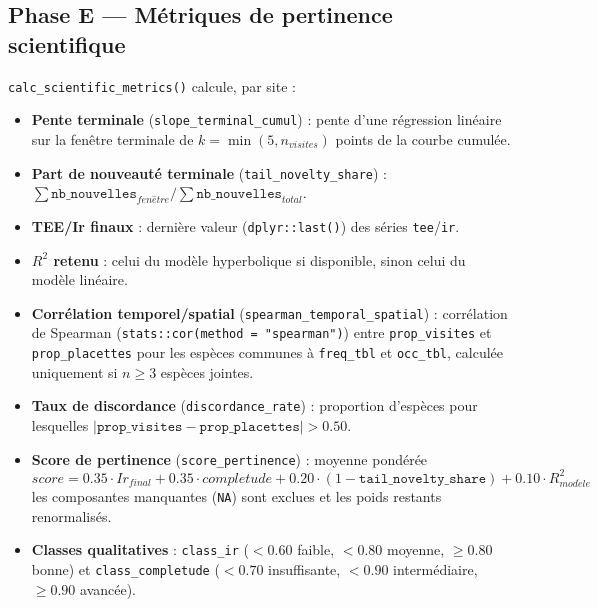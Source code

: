 \documentclass[11pt,a4paper]{article}
\begin{document}
\subsection{Phase E --- Métriques de pertinence scientifique}
\texttt{calc\_scientific\_metrics()} calcule, par site :
\begin{itemize}[leftmargin=1.2cm]
  \item \textbf{Pente terminale} (\texttt{slope\_terminal\_cumul}) : pente d'une régression linéaire sur la fenêtre terminale de $k = \min(5, n_{visites})$ points de la courbe cumulée.
  \item \textbf{Part de nouveauté terminale} (\texttt{tail\_novelty\_share}) : $\sum \texttt{nb\_nouvelles}_{fen\hat{e}tre} / \sum \texttt{nb\_nouvelles}_{total}$.
  \item \textbf{TEE/Ir finaux} : dernière valeur (\texttt{dplyr::last()}) des séries \texttt{tee}/\texttt{ir}.
  \item \textbf{$R^2$ retenu} : celui du modèle hyperbolique si disponible, sinon celui du modèle linéaire.
  \item \textbf{Corrélation temporel/spatial} (\texttt{spearman\_temporal\_spatial}) : corrélation de Spearman (\texttt{stats::cor(method = "spearman")}) entre \texttt{prop\_visites} et \texttt{prop\_placettes} pour les espèces communes à \texttt{freq\_tbl} et \texttt{occ\_tbl}, calculée uniquement si $n \ge 3$ espèces jointes.
  \item \textbf{Taux de discordance} (\texttt{discordance\_rate}) : proportion d'espèces pour lesquelles $|\texttt{prop\_visites} - \texttt{prop\_placettes}| > 0.50$.
  \item \textbf{Score de pertinence} (\texttt{score\_pertinence}) : moyenne pondérée
  $$ score = 0.35 \cdot Ir_{final} + 0.35 \cdot completude + 0.20 \cdot (1 - \texttt{tail\_novelty\_share}) + 0.10 \cdot R^2_{mod\grave{e}le} $$
  les composantes manquantes (\texttt{NA}) sont exclues et les poids restants renormalisés.
  \item \textbf{Classes qualitatives} : \texttt{class\_ir} ($<0.60$ faible, $<0.80$ moyenne, $\ge 0.80$ bonne) et \texttt{class\_completude} ($<0.70$ insuffisante, $<0.90$ intermédiaire, $\ge 0.90$ avancée).
\end{itemize}
\end{document}
